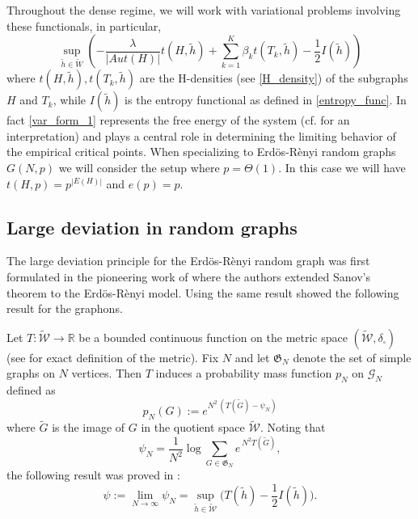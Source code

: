 \documentclass[12pt]{article}
\def\er{ Erd{\"o}s-R{\`e}nyi }
\numberwithin{equation}{section}
\begin{document}
Throughout the dense regime, we will work with variational problems involving these functionals, in particular, 
\begin{equation}
\sup_{\tilde{h} \in \tilde{W}}\left(-\frac{\lambda}{\lvert Aut(H)\rvert} t(H,\tilde{h}) +  \sum_{k=1}^K \beta_k t(T_k, \tilde{h}) -\frac{1}{2} I(\tilde{h})\right)\label{var_form_1}
\end{equation}
where $t(H,\tilde{h}), t(T_k,\tilde{h})$ are the H-densities (see \eqref{H_density}) of the subgraphs $H$ and $T_k$, while $I(\tilde{h})$ is the entropy functional as defined in \eqref{entropy_func}. In fact \eqref{var_form_1} represents the free energy of the system (cf. \cite{chatterjee2013estimating} for an interpretation) and plays a central role in determining the limiting behavior of the empirical critical points. When specializing to \er
 random graphs $G(N,p)$ we will consider the setup where $p=\Theta(1)$. In this case we will have $t(H,p) = p^{|E(H)|}$ and $e(p) = p$.
 

\subsection{Large deviation in random graphs \label{sec:LD_ERGM}}

The large deviation principle for the \er random graph was first formulated  in the pioneering work of \cite{chatterjee2011large} where the authors extended Sanov's theorem to the \er model. Using the same result \cite{chatterjee2013estimating} showed the following result for the graphons.

Let $T:\widetilde{\mathcal W}\to\mathbb R$ be a bounded continuous function on the metric space $(\widetilde{\mathcal W},\delta_\square)$ (see \cite{chatterjee2013estimating} for exact definition of the metric). Fix $N$ and let $\mathfrak G_N$ denote the set of simple graphs on $N$ vertices. Then $T$ induces a probability mass function $p_N$ on $\mathcal G_N$ defined as
\[
p_N(G):=e^{N^2\,(T(\tilde G)-\psi_N)}
\]
where $\tilde G$ is the image of $G$ in the quotient space $\widetilde{\mathcal W}$. Noting that 
\begin{equation}
\psi_N=\frac{1}{N^2}\log\sum_{G\in\mathfrak G_N} e^{\,N^2 T(\tilde G)},
\end{equation}
the following result was proved in \cite{chatterjee2013estimating}:
\[
\psi:=\lim_{N\to\infty}\psi_N
=\sup_{\tilde h\in\widetilde{\mathcal W}}\big(T(\tilde h)-\frac{1}{2}I(\tilde h)\big).
\]
\end{document}
